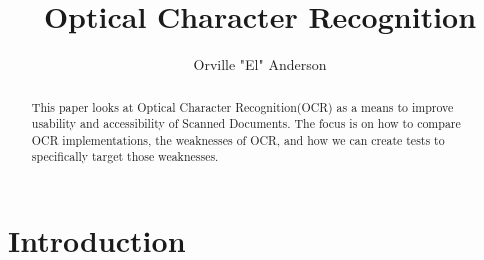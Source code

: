 \documentclass[sigplan,screen,nonacm]{acmart-tagged}
\begin{document}
\title{Optical Character Recognition}

\author{Orville "El" Anderson}


\begin{abstract}

This paper looks at Optical Character Recognition(OCR) as a means to improve usability and accessibility of Scanned Documents. The focus is on how to compare OCR implementations, the weaknesses of OCR, and how we can create tests to specifically target those weaknesses.

\end{abstract}

\doclicenseThis



\maketitle

\section{Introduction}
\label{sec:introduction}
\end{document}
